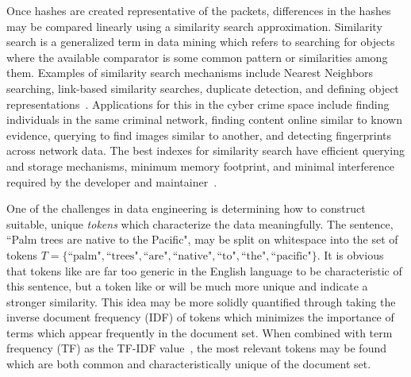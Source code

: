 Once hashes are created representative of the packets, differences in the hashes may be compared linearly using a similarity search approximation. Similarity search is a generalized term in data mining which refers to searching for objects where the available comparator is some common pattern or similarities among them. Examples of similarity search mechanisms include Nearest Neighbors searching, link-based similarity searches, duplicate detection, and defining object representations~\cite{lshforest}. Applications for this in the cyber crime space include finding individuals in the same criminal network, finding content online similar to known evidence, querying to find images similar to another, and detecting fingerprints across network data. The best indexes for similarity search have efficient querying and storage mechanisms, minimum memory footprint, and minimal interference required by the developer and maintainer~\cite{simsearch}.

One of the challenges in data engineering is determining how to construct suitable, unique \textit{tokens} which characterize the data meaningfully. The sentence, ``Palm trees are native to the Pacific", may be split on whitespace into the set of tokens $T = \{\text{``palm"}, \text{``trees"}, \text{``are"}, \text{``native"}, \text{``to"}, \text{``the"}, \text{``pacific"}\}$. It is obvious that tokens like  are far too generic in the English language to be characteristic of this sentence, but a token like  or  will be much more unique and indicate a stronger similarity. This idea may be more solidly quantified through taking the inverse document frequency (IDF) of tokens which minimizes the importance of terms which appear frequently in the document set. When combined with term frequency (TF) as the TF-IDF value~\cite{tf-idf}, the most relevant tokens may be found which are both common and characteristically unique of the document set.
